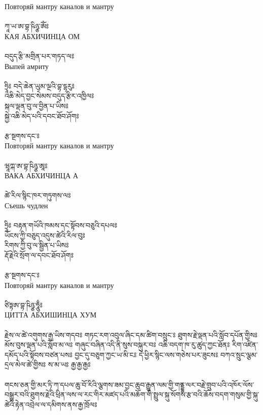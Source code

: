 Повторяй мантру каналов и мантру\\
\\
{\ti ཀཱ་ཡ་ཨ་བྷ་ཥིཉྩ་ཨོཾཿ }\\
КАЯ АБХИЧИНЦА ОМ\\
\\
{\ti བདུད་རྩི་མགྲིན་པར་གཏད་ལཿ }\\
Выпей амриту\\
\\
{\ti ཧྲཱིཿ བདེ་ཆེན་ཡུམ་ལྔའི་བྷ་དྷརུཿ \\
འཆི་མེད་བྱང་སེམས་བདུད་རྩིར་འཁྱིལཿ \\
སྐལ་ལྡན་བུ་ལ་བྱིན་པ་ཡིསཿ \\
སྐྱེ་འཆི་མེད་པའི་དབང་ཐོབ་ཤོགཿ \\
\\
རྩ་སྔགས་དང་ཿ }\\
Повторяй мантру каналов и мантру\\
\\
{\ti ཝཱཀྐ་ཨ་བྷ་ཥིཉྩ་ཨཱཿ }\\
ВАКА АБХИЧИНЦА А\\
\\
{\ti ཚེ་རིལ་སྙིང་ཁར་གཏུགས་ལཿ }\\
Съешь чудлен\\
\\
{\ti ཧྲཱིཿ བརྟན་གཡོའི་ཁམས་དང་སྟོབས་བཅུའི་དཔལཿ \\
ཡོངས་ཀྱི་བཅུད་འདུས་ཚེའི་རིལ་བུཿ \\
རིགས་ཀྱི་བུ་ལ་སྦྱིན་པ་ཡིསཿ \\
རྡོ་རྗེའི་སྲོག་ལ་དབང་ཐོབ་ཤོགཿ \\
\\
རྩ་སྔགས་དང་ཿ }\\
Повторяй мантру каналов и мантру\\
\\
{\ti ཙིཏྟཨ་བྷ་ཥིཉྩ་ཧཱུྃཿ }\\
ЦИТТА АБХИШИНЦА ХУМ\\
\\
{\ti རྗེས་ལ་ཚེ་འགུགས་རྒྱ་ཡིས་གདབཿ གཏང་རག་འབུལ་ཞིང་དམ་ཚིག་བསྲུང་ཿ ཐུགས་རྗེ་ལྡན་པའི་སློབ་དཔོན་གྱིསཿ མོས་བུས་ལྡན་པའི་སློབ་མ་ལཿ གཞུང་བཞིན་འདི་ནི་སུས་བསྐུར་བཿ འཆི་བདག་ཁ་རུ་ཚུད་ཀྱང་ཐོནཿ རིག་འཛིན་དམོད་པའི་སྟོབས་བཙན་པསཿ བྱང་དུ་བཅུག་ཀྱང་ཡ་མི་ངཿ དེ་ཕྱིར་སྙིང་ལས་གཅེས་པར་ཟུངསཿ བཀའ་སྲུང་ལྕམ་དྲལ་མེལ་ཚེ་གྱིསཿ ས་མ་ཡཿ རྒྱ་རྒྱ་རྒྱཿ \\
\\
གངས་ཅན་གྱི་མར་ཏི་ཀ་དཔལ་ཆུ་བོ་རིའི་ལྕགས་ཟམ་བྱང་ཆུབ་རྒྱུན་ལམ་གྱི་གནྡྷ་ལར་བརྗེ་གྲུབ་པའི་འཁོར་ལོས་བསྒྱུར་བའི་ཐུགས་རྗེའི་ཕྲིན་ལས་ལ་རང་གིར་མཛད་པའི་མཆོག་གི་སྤྲུལ་སྐུ་སོགས་རྩ་བའི་ཆོས་བདག་གསུམ་གྱི་སྐུ་ཚེའི་རྟེན་འབྲེལ་ལ་དམིགས་ནས་རྒྱ་ཁྲོལཿ}\\


